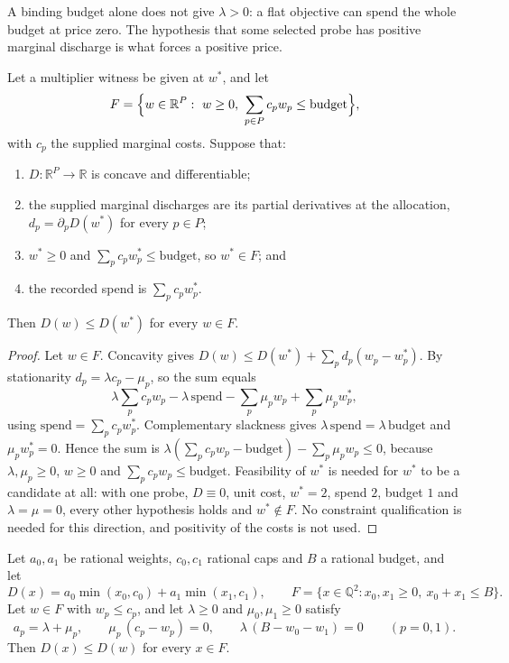 A binding budget alone does not give $\lambda > 0$: a flat objective can spend the whole budget at
price zero. The hypothesis that some selected probe has positive marginal discharge is what forces a
positive price.

\begin{proposition}\label{prop:e6-sufficient}
Let a multiplier witness be given at $w^*$, and let
\[
  F = \Bigl\{ w \in \mathbb R^P :\ w \ge 0,\ \sum_{p \in P} c_p w_p \le \text{budget} \Bigr\},
\]
with $c_p$ the supplied marginal costs. Suppose that:
\begin{enumerate}
  \item $D : \mathbb R^P \to \mathbb R$ is concave and differentiable;
  \item the supplied marginal discharges are its partial derivatives at the allocation,
    $d_p = \partial_p D(w^*)$ for every $p \in P$;
  \item $w^* \ge 0$ and $\sum_p c_p w^*_p \le \text{budget}$, so $w^* \in F$; and
  \item the recorded spend is $\sum_p c_p w^*_p$.
\end{enumerate}
Then $D(w) \le D(w^*)$ for every $w \in F$.
\end{proposition}

\begin{proof}
Let $w \in F$. Concavity gives $D(w) \le D(w^*) + \sum_p d_p (w_p - w^*_p)$. By stationarity
$d_p = \lambda c_p - \mu_p$, so the sum equals
\[
  \lambda \sum_p c_p w_p - \lambda\,\text{spend} - \sum_p \mu_p w_p + \sum_p \mu_p w^*_p ,
\]
using $\text{spend} = \sum_p c_p w^*_p$. Complementary slackness gives $\lambda\,\text{spend} =
\lambda\,\text{budget}$ and $\mu_p w^*_p = 0$. Hence the sum is
$\lambda(\sum_p c_p w_p - \text{budget}) - \sum_p \mu_p w_p \le 0$, because $\lambda, \mu_p \ge 0$,
$w \ge 0$ and $\sum_p c_p w_p \le \text{budget}$. Feasibility of $w^*$ is needed for $w^*$ to be a
candidate at all: with one probe, $D \equiv 0$, unit cost, $w^* = 2$, spend $2$, budget $1$ and
$\lambda = \mu = 0$, every other hypothesis holds and $w^* \notin F$. No constraint qualification is
needed for this direction, and positivity of the costs is not used.
\end{proof}

\begin{theorem}\label{thm:e6-caps}
Let $a_0, a_1$ be rational weights, $c_0, c_1$ rational caps and $B$ a rational budget, and let
\[
  D(x) = a_0 \min(x_0, c_0) + a_1 \min(x_1, c_1), \qquad
  F = \{x \in \mathbb Q^2 : x_0, x_1 \ge 0,\ x_0 + x_1 \le B\}.
\]
Let $w \in F$ with $w_p \le c_p$, and let $\lambda \ge 0$ and $\mu_0, \mu_1 \ge 0$ satisfy
\[
  a_p = \lambda + \mu_p, \qquad \mu_p\,(c_p - w_p) = 0, \qquad \lambda\,(B - w_0 - w_1) = 0
  \qquad (p = 0, 1).
\]
Then $D(x) \le D(w)$ for every $x \in F$.
\end{theorem}


